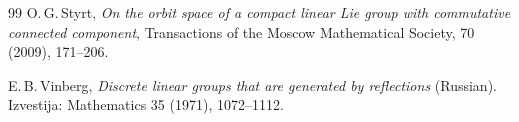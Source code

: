 \documentclass[english,12pt,oneside]{amsproc}
\numberwithin{equation}{section}
\theoremstyle{plain}
\theoremstyle{definition}
\theoremstyle{remark}
\begin{document}
\begin{thebibliography}{99}
 O.\,G.\,Styrt, \textit{On the orbit space of a compact linear Lie group with commutative connected component}, Transactions of the Moscow Mathematical Society, 70 (2009), 171--206.

 E.\,B.\,Vinberg, \textit{Discrete linear groups that are generated by reflections} (Russian).
Izvestija: Mathematics 35 (1971), 1072--1112.

\end{thebibliography}
\end{document}
